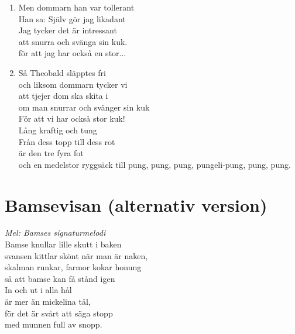 \documentclass[twoside, openright]{report}
\begin{document}
\begin{enumerate}
\item Men dommarn han var tollerant\\
Han sa: Själv gör jag likadant\\
Jag tycker det är intressant\\
att snurra och svänga sin kuk.\\
för att jag har också en stor...

\item Så Theobald släpptes fri\\
och liksom dommarn tycker vi\\
att tjejer dom ska skita i\\
om man snurrar och svänger sin kuk\\
För att vi har också stor kuk!\\
Lång kraftig och tung\\
Från dess topp till dess rot\\
är den tre fyra fot\\
och en medelstor ryggsäck till pung, pung, pung, pungeli-pung, pung, pung.

\end{enumerate}

\section{Bamsevisan (alternativ version)}
\textit{Mel: Bamses signaturmelodi}\\

Bamse knullar lille skutt i baken\\
svansen kittlar skönt när man är naken,\\
skalman runkar, farmor kokar honung\\
så att bamse kan få stånd igen\\

In och ut i alla hål\\
är mer än mickelina tål,\\
för det är svårt att säga stopp\\
med munnen full av snopp.

\cleardoublepage
{}
\printindex
\end{document}
